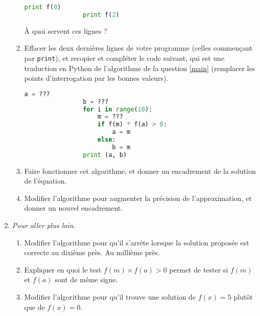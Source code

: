 \documentclass{article}
\begin{document}
\begin{enumerate}
\begin{enumerate}
\begin{lstlisting}[language=python,frame=lines,mathescape=true]
                print f(0)
                print f(2)
                \end{lstlisting}
                À quoi servent ces lignes ?
            \item Effacer les deux dernières lignes de votre programme (celles commençant par \texttt{print}), et recopier et compléter le code suivant, qui est une traduction en Python de l'algorithme de la question \ref{main} (remplacer les points d'interrogation par les bonnes valeurs).
                \begin{lstlisting}[language=python,frame=lines,mathescape=true]
                a = ???
                b = ???
                for i in range(10):
                    m = ???
                    if f(m) * f(a) > 0:
                        a = m
                    else:
                        b = m
                print (a, b)
                \end{lstlisting}
            \item Faire fonctionner cet algorithme, et donner un encadrement de la solution de l'équation.
            \item Modifier l'algorithme pour augmenter la précision de l'approximation, et donner un nouvel encadrement.
        \end{enumerate}
    \item \emph{Pour aller plus loin.}
        \begin{enumerate}
            \item Modifier l'algorithme pour qu'il s'arrête lorsque la solution proposée est correcte au dixième près. Au millième près.
            \item Expliquer en quoi le test $f(m)\times f(a)>0$ permet de tester si $f(m)$ et $f(a)$ sont de même signe.
            \item Modifier l'algorithme pour qu'il trouve une solution de $f(x)=5$ plutôt que de $f(x)=0$.
        \end{enumerate}
\end{enumerate}
\end{document}
